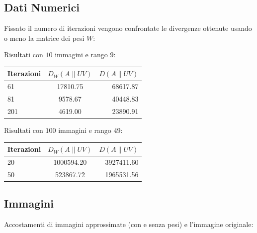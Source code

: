 \documentclass[a4paper]{article} %
\begin{document}
\subsection{Dati Numerici}
Fissato il numero di iterazioni vengono confrontate le divergenze ottenute usando o meno la matrice dei pesi $W$:

\begin{center}
  Risultati con $10$ immagini e rango $9$: \\

  \begin{tabular}{| l | c | r |}
    \hline
    Iterazioni & $D_W(A\lVert UV)$ & $D(A\lVert UV)$ \\
    \hline
    61 & 17810.75 & 68617.87 \\
    81 &  9578.67 & 40448.83 \\
    201 & 4619.00 & 23890.91 \\
    \hline
  \end{tabular}
  \vspace{0.5cm}

  Risultati con $100$ immagini e rango $49$: \\

  \begin{tabular}{| l | c | r |}
    \hline
    Iterazioni & $D_W(A\lVert UV)$ & $D(A\lVert UV)$ \\
    \hline
    20 & 1000594.20 & 3927411.60 \\
    50 &  523867.72 & 1965531.56 \\
    \hline
  \end{tabular}

\end{center}

\subsection{Immagini}
Accostamenti di immagini approssimate (con e senza pesi) e l'immagine originale:
\end{document}
